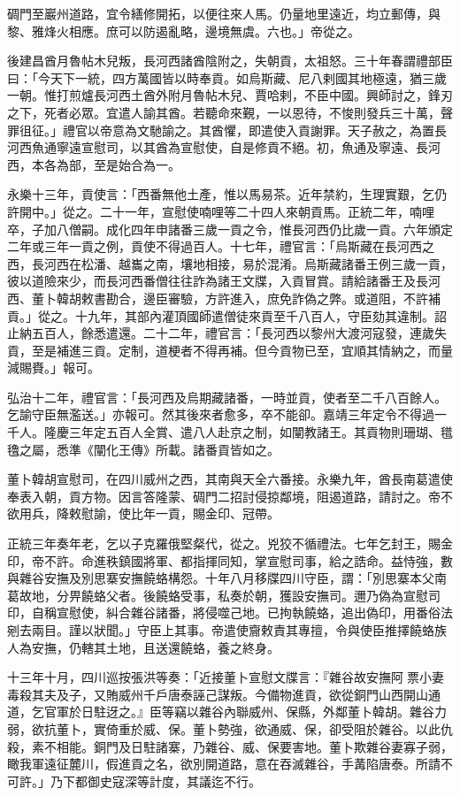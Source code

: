 \begin{pinyinscope}
碉門至巖州道路，宜令繕修開拓，以便往來人馬。仍量地里遠近，均立郵傳，與黎、雅烽火相應。庶可以防遏亂略，邊境無虞。六也。」帝從之。

後建昌酋月魯帖木兒叛，長河西諸酋陰附之，失朝貢，太祖怒。三十年春謂禮部臣曰：「今天下一統，四方萬國皆以時奉貢。如烏斯藏、尼八剌國其地極遠，猶三歲一朝。惟打煎爐長河西土酋外附月魯帖木兒、賈哈剌，不臣中國。興師討之，鋒刃之下，死者必眾。宜遣人諭其酋。若聽命來覲，一以恩待，不悛則發兵三十萬，聲罪徂征。」禮官以帝意為文馳諭之。其酋懼，即遣使入貢謝罪。天子赦之，為置長河西魚通寧遠宣慰司，以其酋為宣慰使，自是修貢不絕。初，魚通及寧遠、長河西，本各為部，至是始合為一。

永樂十三年，貢使言：「西番無他土產，惟以馬易茶。近年禁約，生理實艱，乞仍許開中。」從之。二十一年，宣慰使喃哩等二十四人來朝貢馬。正統二年，喃哩卒，子加八僧嗣。成化四年申諸番三歲一貢之令，惟長河西仍比歲一貢。六年頒定二年或三年一貢之例，貢使不得過百人。十七年，禮官言：「烏斯藏在長河西之西，長河西在松潘、越巂之南，壤地相接，易於混淆。烏斯藏諸番王例三歲一貢，彼以道險來少，而長河西番僧往往詐為諸王文牒，入貢冒賞。請給諸番王及長河西、董卜韓胡敕書勘合，邊臣審驗，方許進入，庶免詐偽之弊。或道阻，不許補貢。」從之。十九年，其部內灌頂國師遣僧徒來貢至千八百人，守臣劾其違制。詔止納五百人，餘悉遣還。二十二年，禮官言：「長河西以黎州大渡河寇發，連歲失貢，至是補進三貢。定制，道梗者不得再補。但今貢物已至，宜順其情納之，而量減賜賚。」報可。

弘治十二年，禮官言：「長河西及烏期藏諸番，一時並貢，使者至二千八百餘人。乞諭守臣無濫送。」亦報可。然其後來者愈多，卒不能卻。嘉靖三年定令不得過一千人。隆慶三年定五百人全賞、遣八人赴京之制，如闡教諸王。其貢物則珊瑚、氆氌之屬，悉準《闡化王傳》所載。諸番貢皆如之。

董卜韓胡宣慰司，在四川威州之西，其南與天全六番接。永樂九年，酋長南葛遣使奉表入朝，貢方物。因言答隆蒙、碉門二招討侵掠鄰境，阻遏道路，請討之。帝不欲用兵，降敕慰諭，使比年一貢，賜金印、冠帶。

正統三年奏年老，乞以子克羅俄堅粲代，從之。兇狡不循禮法。七年乞封王，賜金印，帝不許。命進秩鎮國將軍、都指揮同知，掌宣慰司事，給之誥命。益恃強，數與雜谷安撫及別思寨安撫饒蛒構怨。十年八月移牒四川守臣，謂：「別思寨本父南葛故地，分畀饒蛒父者。後饒蛒受事，私奏於朝，獲設安撫司。邇乃偽為宣慰司印，自稱宣慰使，糾合雜谷諸番，將侵噬己地。已拘執饒蛒，追出偽印，用番俗法剜去兩目。謹以狀聞。」守臣上其事。帝遣使齎敕責其專擅，令與使臣推擇饒蛒族人為安撫，仍轄其土地，且送還饒蛒，養之終身。

十三年十月，四川巡按張洪等奏：「近接董卜宣慰文牒言：『雜谷故安撫阿票小妻毒殺其夫及子，又賄威州千戶唐泰誣己謀叛。今備物進貢，欲從銅門山西開山通道，乞官軍於日駐迓之。』臣等竊以雜谷內聯威州、保縣，外鄰董卜韓胡。雜谷力弱，欲抗董卜，實倚重於威、保。董卜勢強，欲通威、保，卻受阻於雜谷。以此仇殺，素不相能。銅門及日駐諸寨，乃雜谷、威、保要害地。董卜欺雜谷妻寡子弱，瞰我軍遠征麓川，假進貢之名，欲別開道路，意在吞滅雜谷，手冓陷唐泰。所請不可許。」乃下都御史寇深等計度，其議迄不行。


\end{pinyinscope}
